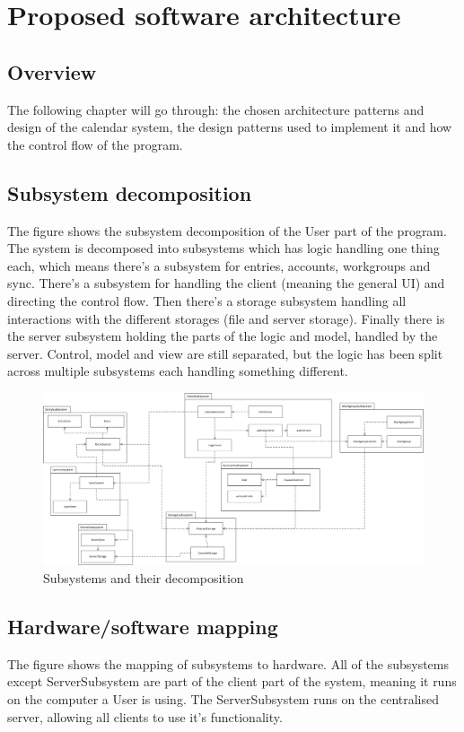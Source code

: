 \section{Proposed software architecture}

\subsection{Overview}
The following chapter will go through: the chosen architecture patterns and design of the calendar system, the design patterns used to implement it and how the control flow of the program.
\subsection{Subsystem decomposition}

The figure shows the subsystem decomposition of the User part of the program. The system is decomposed into subsystems which has logic handling one thing each, which means there’s a subsystem for entries, accounts, workgroups and sync. 
There’s a subsystem for handling the client (meaning the general UI) and directing the control flow. Then there’s a storage subsystem handling all interactions with the different storages (file and server storage). Finally there is the server subsystem holding the parts of the logic and model, handled by the server.
Control, model and view are still separated, but the logic has been split across multiple subsystems each handling something different.

\begin{figure}[h]
\centering
\includegraphics[scale = 0.35]{Subsystem}
\caption{Subsystems and their decomposition}
\end{figure}

\pagebreak

\subsection{Hardware/software mapping}
The figure shows the mapping of subsystems to hardware. All of the subsystems except ServerSubsystem are part of the client part of the system, meaning it runs on the computer a User is using. The ServerSubsystem runs on the centralised server, allowing all clients to use it’s functionality.

